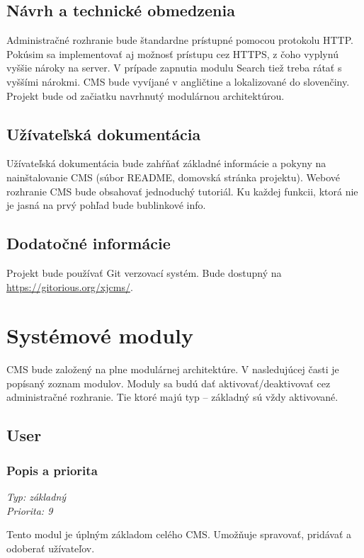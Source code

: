 \documentclass[a4paper,titlepage,11pt]{article}
\begin{document}
\subsection{Návrh a technické obmedzenia}
Administračné rozhranie bude štandardne prístupné pomocou protokolu HTTP. 
Pokúsim sa implementovať aj možnosť prístupu cez HTTPS, z čoho vyplynú vyššie nároky na server. 
V prípade zapnutia modulu Search tiež treba rátať s vyššími nárokmi.
CMS bude vyvíjané v angličtine a lokalizované do slovenčiny. Projekt bude od začiatku navrhnutý modulárnou architektúrou.

\subsection{Užívateľská dokumentácia}
Užívateľská dokumentácia bude zahŕňať základné informácie a pokyny na nainštalovanie CMS (súbor README, domovská stránka projektu). 
Webové rozhranie CMS bude obsahovať jednoduchý tutoriál. Ku každej funkcii, ktorá nie je jasná na prvý pohľad bude bublinkové info.

\subsection{Dodatočné informácie}
Projekt bude používať Git verzovací systém. Bude dostupný na \url{https://gitorious.org/xjcms/}.

\newpage
\section{Systémové moduly}
CMS bude založený na plne modulárnej architektúre. V nasledujúcej časti je popísaný zoznam modulov. 
Moduly sa budú dať aktivovať\slash deaktivovať cez administračné rozhranie. Tie ktoré majú typ -- základný sú vždy aktivované.

\subsection{User}
\subsubsection{Popis a priorita}
\begin{flushleft}
 \emph{Typ: základný}\\
 \emph{Priorita: 9}\\
\end{flushleft}
Tento modul je úplným základom celého CMS. Umožňuje spravovať, pridávať a odoberať užívateľov.
\end{document}
